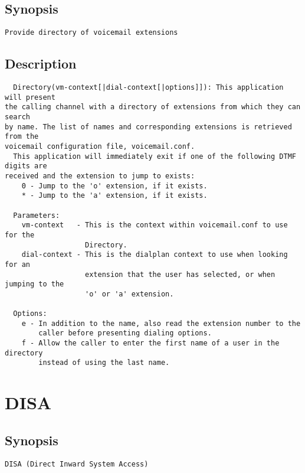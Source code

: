 \subsection{Synopsis}
\begin{verbatim}
Provide directory of voicemail extensions
\end{verbatim}
\subsection{Description}
\begin{verbatim}
  Directory(vm-context[|dial-context[|options]]): This application will present
the calling channel with a directory of extensions from which they can search
by name. The list of names and corresponding extensions is retrieved from the
voicemail configuration file, voicemail.conf.
  This application will immediately exit if one of the following DTMF digits are
received and the extension to jump to exists:
    0 - Jump to the 'o' extension, if it exists.
    * - Jump to the 'a' extension, if it exists.

  Parameters:
    vm-context   - This is the context within voicemail.conf to use for the
                   Directory.
    dial-context - This is the dialplan context to use when looking for an
                   extension that the user has selected, or when jumping to the
                   'o' or 'a' extension.

  Options:
    e - In addition to the name, also read the extension number to the
        caller before presenting dialing options.
    f - Allow the caller to enter the first name of a user in the directory
        instead of using the last name.

\end{verbatim}


\section{DISA}
\subsection{Synopsis}
\begin{verbatim}
DISA (Direct Inward System Access)
\end{verbatim}
